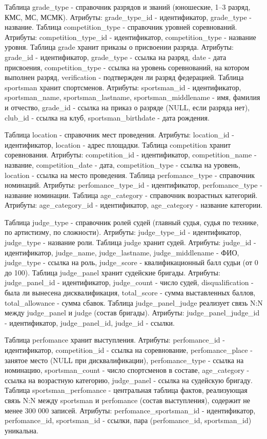 \documentclass[areasetadvanced]{scrartcl}
\begin{document}
Таблица grade\_type - справочник разрядов и званий (юношеские, 1--3 разряд, КМС, МС, МСМК). Атрибуты: grade\_type\_id - идентификатор, grade\_type - название.
Таблица competition\_type - справочник уровней соревнований. Атрибуты: competition\_type\_id - идентификатор, competition\_type - название уровня.
Таблица grade хранит приказы о присвоении разряда. Атрибуты: grade\_id - идентификатор, grade\_type - ссылка на разряд, date - дата присвоения,
competition\_type - ссылка на уровень соревнований, на котором выполнен разряд, verification - подтвержден ли разряд федерацией.
Таблица sportsman хранит спортсменов. Атрибуты: sportsman\_id - идентификатор, sportsman\_name, sportsman\_lastname, sportsman\_middlename - имя, фамилия и отчество,
grade\_id - ссылка на приказ о разряде (NULL, если разряда нет), club\_id - ссылка на клуб, sportsman\_birthdate - дата рождения.

Таблица location - справочник мест проведения. Атрибуты: location\_id - идентификатор, location - адрес площадки.
Таблица competition хранит соревнования. Атрибуты: competition\_id - идентификатор, competition\_name - название, competition\_date - дата,
competition\_type - ссылка на уровень, location - ссылка на место проведения.
Таблица perfomance\_type - справочник номинаций. Атрибуты: perfomance\_type\_id - идентификатор, perfomance\_type - название номинации.
Таблица age\_category - справочник возрастных категорий. Атрибуты: age\_category\_id - идентификатор, age\_category - название категории.

Таблица judge\_type - справочник ролей судей (главный судья, судья по технике, по артистизму, по сложности). Атрибуты: judge\_type\_id - идентификатор, judge\_type - название роли.
Таблица judge хранит судей. Атрибуты: judge\_id - идентификатор, judge\_name, judge\_lastname, judge\_middlename - ФИО, judge\_type - ссылка на роль, judge\_score - квалификационный балл судьи (от 0 до 100).
Таблица judge\_panel хранит судейские бригады. Атрибуты: judge\_panel\_id - идентификатор, judge\_count - число судей, disqualification - была ли вынесена дисквалификация,
total\_score - сумма выставленных баллов, total\_allowance - сумма сбавок.
Таблица judge\_panel\_judge реализует связь N:N между judge\_panel и judge (состав бригады). Атрибуты: judge\_panel\_judge\_id - идентификатор, judge\_panel\_id, judge\_id - ссылки.

Таблица perfomance хранит выступления. Атрибуты: perfomance\_id - идентификатор, competition\_id - ссылка на соревнование, perfomance\_place - занятое место (NULL при дисквалификации),
perfomance\_type - ссылка на номинацию, sportsman\_count - число спортсменов в составе, age\_category - ссылка на возрастную категорию, judge\_panel - ссылка на судейскую бригаду.
Таблица sportsman\_perfomance - центральная таблица фактов, реализующая связь N:N между sportsman и perfomance (состав выступления), содержит не менее 300 000 записей.
Атрибуты: perfomance\_sportsman\_id - идентификатор, perfomance\_id, sportsman\_id - ссылки, пара (perfomance\_id, sportsman\_id) уникальна.
\end{document}
